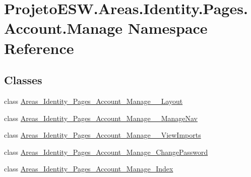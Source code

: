 \hypertarget{namespace_projeto_e_s_w_1_1_areas_1_1_identity_1_1_pages_1_1_account_1_1_manage}{}\section{Projeto\+E\+S\+W.\+Areas.\+Identity.\+Pages.\+Account.\+Manage Namespace Reference}
\label{namespace_projeto_e_s_w_1_1_areas_1_1_identity_1_1_pages_1_1_account_1_1_manage}
\subsection*{Classes}
\begin{DoxyCompactItemize}
\item 
class \mbox{\hyperlink{class_projeto_e_s_w_1_1_areas_1_1_identity_1_1_pages_1_1_account_1_1_manage_1_1_areas___identityc6380326995a7c32954b2e75619ca337}{Areas\+\_\+\+Identity\+\_\+\+Pages\+\_\+\+Account\+\_\+\+Manage\+\_\+\+\_\+\+Layout}}
\item 
class \mbox{\hyperlink{class_projeto_e_s_w_1_1_areas_1_1_identity_1_1_pages_1_1_account_1_1_manage_1_1_areas___identity9df048355e46256b00c921251d1ec8a1}{Areas\+\_\+\+Identity\+\_\+\+Pages\+\_\+\+Account\+\_\+\+Manage\+\_\+\+\_\+\+Manage\+Nav}}
\item 
class \mbox{\hyperlink{class_projeto_e_s_w_1_1_areas_1_1_identity_1_1_pages_1_1_account_1_1_manage_1_1_areas___identity223b6bd2eddef8f334e0a25500482741}{Areas\+\_\+\+Identity\+\_\+\+Pages\+\_\+\+Account\+\_\+\+Manage\+\_\+\+\_\+\+View\+Imports}}
\item 
class \mbox{\hyperlink{class_projeto_e_s_w_1_1_areas_1_1_identity_1_1_pages_1_1_account_1_1_manage_1_1_areas___identityf71e623a7e7907515cd465c2fe005b76}{Areas\+\_\+\+Identity\+\_\+\+Pages\+\_\+\+Account\+\_\+\+Manage\+\_\+\+Change\+Password}}
\item 
class \mbox{\hyperlink{class_projeto_e_s_w_1_1_areas_1_1_identity_1_1_pages_1_1_account_1_1_manage_1_1_areas___identity605f2cac3dc5a4ea38af9197eadd5652}{Areas\+\_\+\+Identity\+\_\+\+Pages\+\_\+\+Account\+\_\+\+Manage\+\_\+\+Index}}
\end{DoxyCompactItemize}
